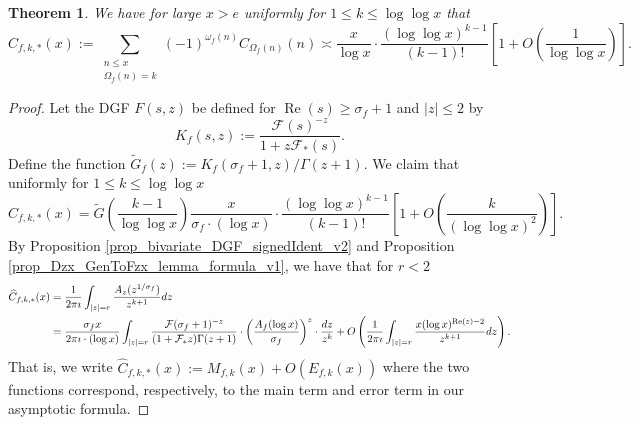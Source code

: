 \documentclass[11pt,reqno,a4letter]{article}
\numberwithin{figure}{section}
\numberwithin{table}{section}
\theoremstyle{plain}
\newtheorem{theorem}{Theorem}
\numberwithin{theorem}{section}
\theoremstyle{definition}
\renewcommand{\Re}{\operatorname{Re}}
\begin{document}
\begin{theorem}
\label{theorem_HatCkAstAsymptotics_v1}
We have for large $x > e$ uniformly for $1 \leq k \leq \log\log x$ that 
\[
\widehat{C}_{f,k,\ast}(x) := \sum_{\substack{n \leq x \\ \Omega_f(n) = k}} 
     (-1)^{\omega_f(n)} C_{\Omega_f(n)}(n) \asymp \frac{x}{\log x} \cdot 
     \frac{(\log\log x)^{k-1}}{(k-1)!} \left[1 + O\left(\frac{1}{\log\log x}\right)\right]. 
\]
\end{theorem}
\begin{proof}
Let the DGF $F(s, z)$ be defined for $\Re(s) \geq \sigma_f + 1$ and $|z| \leq 2$ by 
\[
K_f(s, z) := \frac{\mathcal{F}(s)^{-z}}{1+z \mathcal{F}_{\ast}(s)}. 
\]
Define the function $\widetilde{G}_f(z) := K_f(\sigma_f+1,z) / \Gamma(z+1)$. 
We claim that uniformly for $1 \leq k \leq \log\log x$ 
\[
\widehat{C}_{f,k,\ast}(x) = \widetilde{G}\left(\frac{k-1}{\log\log x}\right)
     \frac{x}{\sigma_f \cdot (\log x)} \cdot \frac{(\log\log x)^{k-1}}{(k-1)!} \left[ 
     1 + O\left(\frac{k}{(\log\log x)^2}\right)\right]. 
\]
By Proposition \ref{prop_bivariate_DGF_signedIdent_v2} and 
Proposition \ref{prop_Dzx_GenToFzx_lemma_formula_v1}, we have that 
for $r < 2$ 
\begin{align}
\notag 
\widehat{C}_{f,k,\ast}(x) & = \frac{1}{2\pi\imath} \int_{|z|=r} \frac{A_z(z^{1/\sigma_f})}{z^{k+1}} dz \\ 
\label{eqn_proof_HatCfkAstx_CIF_formula_v1} 
     & = \frac{\sigma_f x}{2\pi\imath \cdot (\log x)} 
     \int_{|z|=r} \frac{\mathcal{F}(\sigma_f+1)^{-z}}{(1+\mathcal{F}_{\ast} z) \Gamma(z+1)} \cdot 
     \left(\frac{A_f (\log x)}{\sigma_f}\right)^{z} \cdot \frac{dz}{z^k} + 
     O\left(\frac{1}{2\pi\imath} \int_{|z|=r} \frac{x (\log x)^{\Re(z)-2}}{z^{k+1}} dz\right). 
\end{align}
That is, we write $\widehat{C}_{f,k,\ast}(x) := M_{f,k}(x) + O(E_{f,k}(x))$ where the two functions 
correspond, respectively, to the main term and error term in our asymptotic formula. 


\end{proof}
\end{document}
